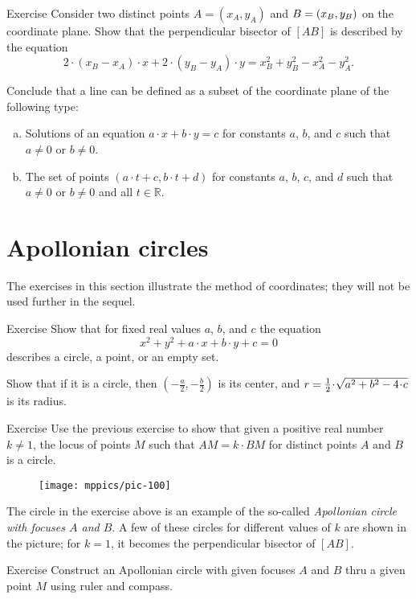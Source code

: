 \begin{thm}{Exercise}\label{ex:line-coord}
Consider two distinct points $A=(x_A,y_A)$ and $B=(x_B,y_B)$ on the coordinate plane.
Show that the perpendicular bisector of $[AB]$ is described by the equation
\[2\cdot (x_B-x_A)\cdot x+2\cdot (y_B-y_A)\cdot y=x_B^2+y_B^2-x_A^2-y_A^2.\]

Conclude that a line can be defined as a subset of the coordinate plane of the following type:
\begin{enumerate}[(a)]
\item  Solutions of an equation $a\cdot x+b\cdot y=c$
for constants $a$, $b$, and $c$ such that $a\ne 0$ or $b\ne0$.
\item\label{ex:line-coord:parameter} The set of points $(a\cdot t+c,b\cdot t+d)$ for constants $a$, $b$, $c$, and $d$ such that $a\ne 0$ or $b\ne0$ and all $t\in \mathbb{R}$.
\end{enumerate}

\end{thm}

\section{Apollonian circles}\label{sec:Apollonian circle}
The exercises in this section illustrate the method of coordinates; they will not be used further in the sequel.

\begin{thm}{Exercise}\label{ex:circle-coord}
Show that for fixed real values $a$, $b$, and $c$ the equation 
\[x^2+y^2+a\cdot x+b\cdot y+c=0\]
describes a circle, a point, or an empty set.

Show that if it is a circle, then $(-\tfrac a2,-\tfrac b2)$ is its center,
and $r\z=\tfrac12\cdot \sqrt{a^2+b^2-4\cdot c}$ is its radius.
\end{thm}

\begin{thm}{Exercise}\label{ex:apolonnius}
Use the previous exercise to show that given a positive real number $k\ne1$,
the locus of points $M$ such that $AM=k\cdot BM$ 
for distinct points $A$ and $B$
is a circle. 
\end{thm}

\begin{figure}[!ht]
\centering
\texttt{[image: mppics/pic-100]}
\end{figure}

The circle in the exercise above is an example of the so-called \emph{Apollonian circle with focuses $A$ and $B$}.
A few of these circles for different values of $k$ are shown in the picture;
for $k=1$, it becomes the perpendicular bisector of $[AB]$.


\begin{thm}{Exercise}\label{ex:apolonnius-construction}
Construct an Apollonian circle with given focuses $A$ and $B$ thru a given point $M$ using ruler and compass.
\end{thm}
